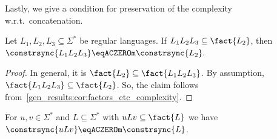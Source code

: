 Lastly, we give a condition for preservation of the complexity w.r.t.~concatenation.

\begin{proposition} \label{constrsync:genresults:prop:concat}
	Let $L_1, L_2, L_3 \subseteq \Sigma^*$ be regular languages.
	If $L_1 L_2 L_3 \subseteq \fact{L_2}$, then $
	\constrsync{L_1 L_2 L_3} \eqACZEROm \constrsync{L_2}.
	$
\end{proposition}
\begin{proof}
	In general, it is $\fact{L_2} 
	\subseteq 
	\fact{L_1 L_2 L_3}$.
	By assumption, $\fact{L_1 L_2 L_3}
	\subseteq \fact{L_2}$.
	So, the claim follows from~\cref{gen_results:cor:factors_etc_complexity}.
\end{proof}

\begin{corollary}
 	For $u,v \in \Sigma^*$ and $L \subseteq \Sigma^*$ with $uLv \subseteq \fact{L}$
 	we have $\constrsync{uLv} \eqACZEROm \constrsync{L}$.
\end{corollary}